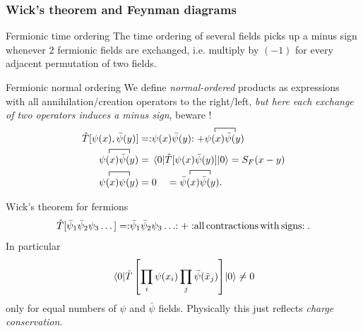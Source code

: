 \subsubsection{Wick's theorem and Feynman diagrams}
\begin{mybox}{Fermionic time ordering}
	The time ordering of several fields picks up a minus sign whenever $2$ fermionic fields are exchanged, i.e. multiply by $(-1)$ for every adjacent permutation of two fields.
\end{mybox}
\begin{mybox}{Fermionic normal ordering}
	We define \emph{normal-ordered} products as expressions with all annihilation/creation operators to the right/left, \emph{but here each exchange of two operators induces a minus sign}, beware !
	\begin{align}
		\hat{T}[\psi(x),\bar{\psi}(y)] &= \normord{\psi(x) \bar{\psi}(y)} + \contraction{}{\psi(x)}{}{\bar{\psi}(y)} \psi(x) \bar{\psi}(y) \\
		\contraction{}{\psi(x)}{}{\bar{\psi}(y)} \psi(x) \bar{\psi}(y) &= \expval{\hat{T}[\psi(x) \bar{\psi}(y)]}{0} = S_F(x-y) \\
		\contraction{}{\psi(x)}{}{\psi(y)} \psi(x) \psi(y) &= 0 \quad = \contraction{}{\bar{\psi}(x)}{}{\bar{\psi}(y)}\bar{\psi}(x) \bar{\psi}(y).
	\end{align}
\end{mybox}
\begin{mybox}{Wick's theorem for fermions}
	\begin{equation}
	\hat{T}[\bar{\psi}_1 \bar{\psi}_2 \psi_3 \dots ] = \mathrel{\mathop{:}}\mathrel{\bar{\psi}_1 \bar{\psi}_2 \psi_3 \dots }\mathrel{\mathop{:}} + \mathrel{\mathop{:}}\mathrel{\mathrm{all\,contractions\,with\,signs}}\mathrel{\mathop{:}}.
	\end{equation}
	In particular
	\begin{equation}
		\expval{\hat{T}\left[\prod_i \psi(x_i) \prod_j \bar{\psi}(\bar{x}_j) \right]}{0} \neq 0
	\end{equation}
	only for equal numbers of $\psi$ and $\bar{\psi}$ fields. Physically this just reflects \emph{charge conservation}.
\end{mybox}
